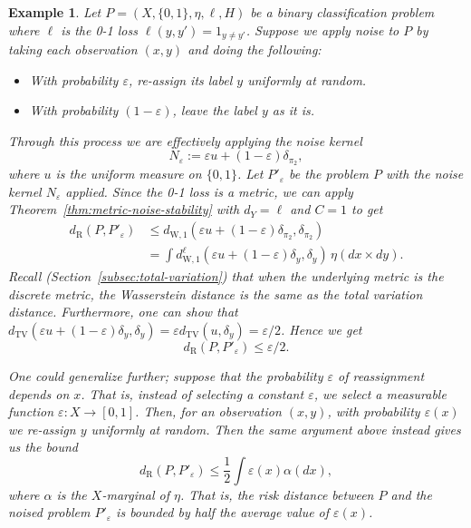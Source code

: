 \documentclass[twoside,11pt]{article}
\newtheorem{examples}[theorem]{Example}
\newcommand{\dexp}[1][]{d_{\mathrm{R}#1}}
\newcommand{\dWp}[1]{d_{\mathrm{W},#1}}
\newcommand{\dW}{\dWp 1}
\newcommand{\TV}{d_{\mathrm{TV}}}
\renewcommand{\epsilon}{\varepsilon}
\begin{document}
    \begin{examples}\label{ex:binary-label-noise}
        Let $P = (X,\{0,1\}, \eta,\ell,H)$ be a binary classification problem where $\ell$ is the 0-1 loss $\ell(y,y')=1_{y\neq y'}$. Suppose we apply noise to $P$ by taking each observation $(x,y)$ and doing the following:
        \begin{itemize}
            \item With probability $\epsilon$, re-assign its label $y$ uniformly at random.
            \item With probability $(1-\epsilon)$, leave the label $y$ as it is.
        \end{itemize}
        Through this process we are effectively applying the noise kernel
        \[N_\epsilon := \epsilon u + (1-\epsilon)\delta_{\pi_2},\]
        where $u$ is the uniform measure on $\{0,1\}$. Let $P'_\epsilon$ be the problem $P$ with the noise kernel $N_\epsilon$ applied.
        Since the 0-1 loss is a metric, we can apply Theorem~\ref{thm:metric-noise-stability} with $d_Y = \ell$ and $C=1$ to get
        \begin{align*}
            \dexp(P,P'_\epsilon) & \leq \dW(\epsilon u + (1-\epsilon)\delta_{\pi_2}, \delta_{\pi_2})
            \\ & = \int \dW^{\ell}(\epsilon u + (1-\epsilon) \delta_y, \delta_y)\, \eta(dx{\times}dy).
        \end{align*}
        Recall (Section~\ref{subsec:total-variation}) that when the underlying metric is the discrete metric, the Wasserstein distance is the same as the total variation distance. Furthermore, one can show that $\TV(\epsilon u + (1-\epsilon) \delta_y, \delta_y) = \epsilon \TV(u,\delta_y) = \epsilon/2$. Hence we get
        \[\dexp(P,P'_\epsilon) \leq \epsilon/2.\]

        One could generalize further; suppose that the probability $\epsilon$ of reassignment \emph{depends on $x$}. That is, instead of selecting a constant $\epsilon$, we select a measurable function $\epsilon:X\to [0,1]$. Then, for an observation $(x,y)$, with probability $\epsilon(x)$ we re-assign $y$ uniformly at random. Then the same argument above instead gives us the bound
        \[\dexp(P,P'_\epsilon) \leq \frac{1}{2}\int \epsilon(x)\alpha(dx),\]
        where $\alpha$ is the $X$-marginal of $\eta$. That is, the risk distance between $P$ and the noised problem $P'_\epsilon$ is bounded by half the \emph{average} value of $\epsilon(x)$.
    \end{examples}
\end{document}
